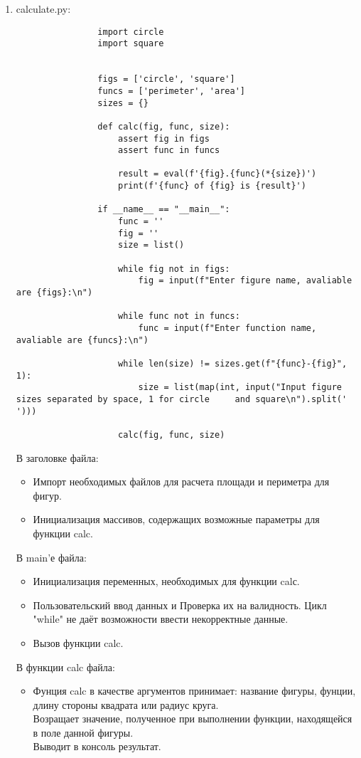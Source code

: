 \documentclass[a4paper,12pt]{report}
\begin{document}
	\begin{enumerate}
		\item calculate.py: 
		
			\begin{lstlisting}
				import circle
				import square
				
				
				figs = ['circle', 'square']
				funcs = ['perimeter', 'area']
				sizes = {}
				
				def calc(fig, func, size):
					assert fig in figs
					assert func in funcs
					
					result = eval(f'{fig}.{func}(*{size})')
					print(f'{func} of {fig} is {result}')
					
				if __name__ == "__main__":
					func = ''
					fig = ''
					size = list()
				
					while fig not in figs:
						fig = input(f"Enter figure name, avaliable are {figs}:\n")
					
					while func not in funcs:
						func = input(f"Enter function name, avaliable are {funcs}:\n")
					
					while len(size) != sizes.get(f"{func}-{fig}", 1):
						size = list(map(int, input("Input figure sizes separated by space, 1 for circle 	and square\n").split(' ')))
				
					calc(fig, func, size)
			\end{lstlisting}
	
			\newpage
			
			В заголовке файла:
			\begin{itemize}
				\item Импорт необходимых файлов для расчета площади и периметра для фигур.
				\item Инициализация массивов, содержащих возможные параметры для функции calc.
			\end{itemize}
			
			
			В main'е файла:
			\begin{itemize}
				\item Инициализация переменных, необходимых для функции calс.
				\item Пользовательский ввод данных и Проверка их на валидность.
				 	  Цикл "while" не даёт возможности ввести некорректные данные.
				\item Вызов функции calc.
			\end{itemize}
		
			В функции calc файла:
			\begin{itemize}
				\item Фунция calc в качестве аргументов принимает: название фигуры, фунции,
					  длину стороны квадрата или радиус круга.\\
				 	  Возращает значение, полученное при выполнении функции, находящейся в
				 	  поле данной фигуры.\\
					  Выводит в консоль результат. 
			\end{itemize}
			

\end{enumerate}
\end{document}

